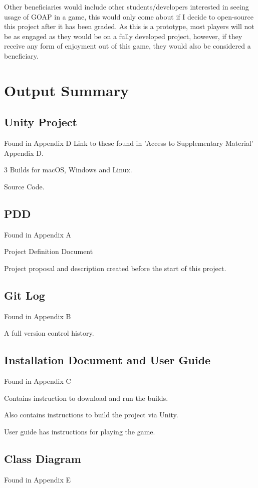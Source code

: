 \documentclass[11pt]{report}
\begin{document}
Other beneficiaries would include other students/developers interested in seeing usage of GOAP in a game, this would only come about if I decide to open-source this project after it has been graded. As this is a prototype, most players will not be as engaged as they would be on a fully developed project, however, if they receive any form of enjoyment out of this game, they would also be considered a beneficiary.

\chapter{Output Summary}

\section{Unity Project}
Found in Appendix D
Link to these found in 'Access to Supplementary Material' Appendix D.

3 Builds for macOS, Windows and Linux.

Source Code.

\section{PDD}
Found in Appendix A

Project Definition Document

Project proposal and description created before the start of this project.

\section{Git Log}
Found in Appendix B 

A full version control history.

\section{Installation Document and User Guide}
Found in Appendix C

Contains instruction to download and run the builds.

Also contains instructions to build the project via Unity.

User guide has instructions for playing the game.

\section{Class Diagram}
Found in Appendix E
\end{document}
